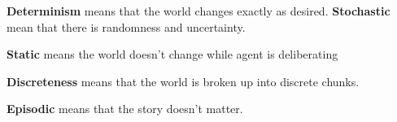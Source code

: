 \begin{definition}
	\textbf{Determinism} means that the world changes exactly as desired. \textbf{Stochastic} mean that there is randomness and uncertainty.
\end{definition}

\begin{definition}
	\textbf{Static} means the world doesn't change while agent is deliberating
\end{definition}

\begin{definition}
	\textbf{Discreteness} means that the world is broken up into discrete chunks.
\end{definition}

\begin{definition}
	\textbf{Episodic} means that the story doesn't matter.
\end{definition}
